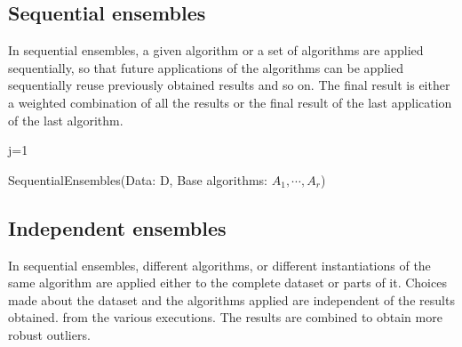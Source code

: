 \subsection*{Sequential ensembles}
In sequential ensembles, a given algorithm or a set of algorithms are applied sequentially, so that future applications of the algorithms can be applied sequentially reuse previously obtained results and so on. The final result is either a weighted combination of all the results or the final result of the last application of the last algorithm. 

\begin{algorithm}
\SetAlgoLined
j=1\;
\caption{SequentialEnsembles(Data: D,
	Base algorithms: $A_1,\cdots,A_r$)}
\end{algorithm}%
\subsection*{Independent ensembles}
In sequential ensembles, different algorithms, or different instantiations of the same algorithm are applied either to the complete dataset or parts of it. Choices made about the dataset 
and the algorithms applied are independent of the results obtained. from the various executions. The results are combined to obtain more robust outliers.

